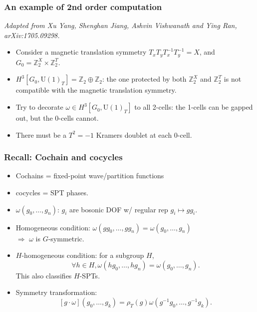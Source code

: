 \documentclass[xcolor=table, 10pt, aspectratio=43]{beamer}
\newcommand{\uone}{\mathrm U(1)}
\begin{document}
\begin{frame}
\frametitle{An example of 2nd order computation}
\emph{\small Adapted from Xu Yang, Shenghan Jiang, Ashvin Vishwanath and Ying Ran, arXiv:1705.09298.}
\begin{itemize}
	\item Consider a magnetic translation symmetry $T_xT_yT_x^{-1}T_y^{-1} = X$, and $G_0=\mathbb Z_2^X\times\mathbb Z_2^T$.
	\item $H^3[G_0,\uone_T]=\mathbb Z_2\oplus\mathbb Z_2$: the one protected by both $\mathbb Z_2^X$ and $\mathbb Z_2^T$ is \alert{not compatible} with the magnetic translation symmetry.
	\item Try to decorate $\omega\in H^3[G_0,\uone_T]$ to all 2-cells: the 1-cells can be gapped out, but the 0-cells \alert{cannot}.
	\item There must be a $T^2=-1$ Kramers doublet at each 0-cell.
\end{itemize}
\begin{center}
\end{center}
\end{frame}

\begin{frame}
	\frametitle{Recall: Cochain and cocycles}
		\begin{itemize}
			\item Cochains = fixed-point wave/partition functions
			\item cocycles = SPT phases.
			\item $\omega(g_0,\ldots,g_n)$: $g_i$ are bosonic DOF w/ regular rep $g_i\mapsto gg_i$.
			\item Homogeneous condition: $\omega(gg_0,\ldots,gg_n)=\omega(g_0,\ldots,g_n)$\\ $\Rightarrow$ $\omega$ is $G$-symmetric.
			\item $H$-homogeneous condition: for a subgroup $H$,
			\[\forall h\in H,\omega(hg_0,\ldots,hg_n)=\omega(g_0,\ldots,g_n).\]
			This also classifies $H$-SPTs.
			\item Symmetry transformation:
			\[[g\cdot\omega](g_0,\ldots,g_k)=\rho_T(g)\omega(g^{-1}g_0,\ldots,g^{-1}g_k).\]
		\end{itemize}
\end{frame}
\end{document}

